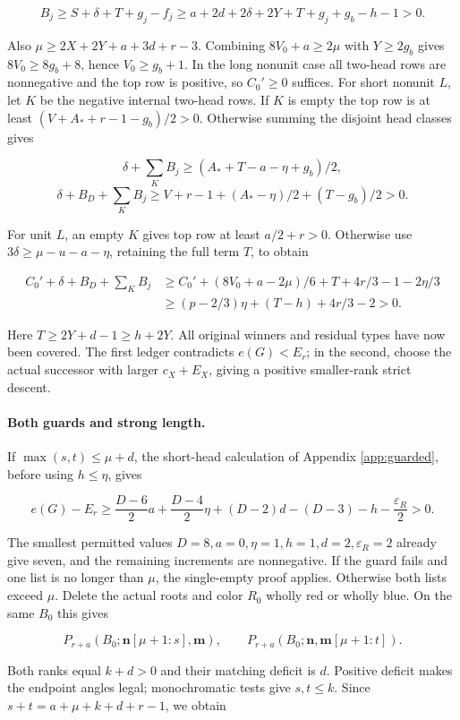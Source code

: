 \documentclass[11pt,a4paper]{article}
\newcommand{\nn}{\mathbf n}\newcommand{\mm}{\mathbf m}
\theoremstyle{definition}
\begin{document}
\[
 B_j\ge S+\delta+T+g_j-f_j
 \ge a+2d+2\delta+2Y+T+g_j+g_b-h-1>0.
\]

Also $\mu\ge2X+2Y+a+3d+r-3$. Combining $8V_0+a\ge2\mu$ with $Y\ge2g_b$ gives $8V_0\ge8g_b+8$, hence $V_0\ge g_b+1$. In the long nonunit case all two-head rows are nonnegative and the top row is positive, so $C_0'\ge0$ suffices. For short nonunit $L$, let $K$ be the negative internal two-head rows. If $K$ is empty the top row is at least $(V+A_*+r-1-g_b)/2>0$. Otherwise summing the disjoint head classes gives

\[
 \delta+\sum_KB_j\ge(A_*+T-a-\eta+g_b)/2,
\]
\[
 \delta+B_D+\sum_KB_j
 \ge V+r-1+(A_*-\eta)/2+(T-g_b)/2>0.
\]

For unit $L$, an empty $K$ gives top row at least $a/2+r>0$. Otherwise use $3\delta\ge\mu-u-a-\eta$, retaining the full term $T$, to obtain

\begin{align*}
 C_0'+\delta+B_D+\sum_KB_j
 &\ge C_0'+(8V_0+a-2\mu)/6+T+4r/3-1-2\eta/3\\
 &\ge(p-2/3)\eta+(T-h)+4r/3-2>0.
\end{align*}

Here $T\ge2Y+d-1\ge h+2Y$. All original winners and residual types have now been covered. The first ledger contradicts $e(G)<E_r$; in the second, choose the actual successor with larger $c_X+E_X$, giving a positive smaller-rank strict descent.

\paragraph{Both guards and strong length.}
If $\max(s,t)\le\mu+d$, the short-head calculation of Appendix \ref{app:guarded}, before using $h\le\eta$, gives

\[
 e(G)-E_r\ge\frac{D-6}{2}a+\frac{D-4}{2}\eta
 +(D-2)d-(D-3)-h-\frac{\varepsilon_R}{2}>0.
\]

The smallest permitted values $D=8,a=0,\eta=1,h=1,d=2,\varepsilon_R=2$ already give seven, and the remaining increments are nonnegative. If the guard fails and one list is no longer than $\mu$, the single-empty proof applies. Otherwise both lists exceed $\mu$. Delete the actual roots and color $R_0$ wholly red or wholly blue. On the same $B_0$ this gives

\[
 P_{r+a}(B_0;\nn[\mu+1:s],\mm),\qquad
 P_{r+a}(B_0;\nn,\mm[\mu+1:t]).
\]

Both ranks equal $k+d>0$ and their matching deficit is $d$. Positive deficit makes the endpoint angles legal; monochromatic tests give $s,t\le k$. Since $s+t=a+\mu+k+d+r-1$, we obtain
\end{document}
